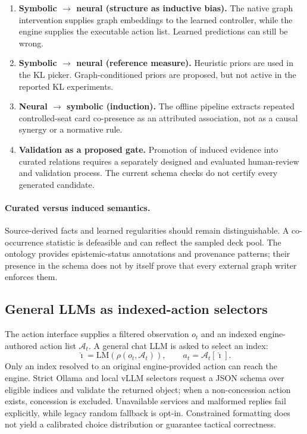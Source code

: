 \documentclass[11pt,a4paper]{article}
\theoremstyle{definition}
\theoremstyle{plain}
\begin{document}
\begin{enumerate}[leftmargin=1.4em, itemsep=2pt]
  \item \textbf{Symbolic $\rightarrow$ neural (structure as inductive bias).} The native graph intervention supplies graph embeddings to the learned controller, while the engine supplies the executable action list. Learned predictions can still be wrong.
  \item \textbf{Symbolic $\rightarrow$ neural (reference measure).} Heuristic priors are used in the KL picker. Graph-conditioned priors are proposed, but not active in the reported KL experiments.
  \item \textbf{Neural $\rightarrow$ symbolic (induction).} The offline pipeline extracts repeated controlled-seat card co-presence as an attributed association, not as a causal synergy or a normative rule.
  \item \textbf{Validation as a proposed gate.} Promotion of induced evidence into curated relations requires a separately designed and evaluated human-review and validation process. The current schema checks do not certify every generated candidate.
\end{enumerate}

\paragraph{Curated versus induced semantics.} Source-derived facts and learned regularities should remain distinguishable. A co-occurrence statistic is defeasible and can reflect the sampled deck pool. The ontology provides epistemic-status annotations and provenance patterns; their presence in the schema does not by itself prove that every external graph writer enforces them.

\subsection{General LLMs as indexed-action selectors}
The action interface supplies a filtered observation $o_t$ and an indexed engine-authored action list $\mathcal A_t$. A general chat LLM is asked to select an index:
\begin{equation}
\hat\imath=\mathrm{LM}\!\left(\rho(o_t,\mathcal A_t)\right),
\qquad a_t=\mathcal A_t[\hat\imath].
\end{equation}
Only an index resolved to an original engine-provided action can reach the engine. Strict Ollama and local vLLM selectors request a JSON schema over eligible indices and validate the returned object; when a non-concession action exists, concession is excluded. Unavailable services and malformed replies fail explicitly, while legacy random fallback is opt-in. Constrained formatting does not yield a calibrated choice distribution or guarantee tactical correctness.
\end{document}
